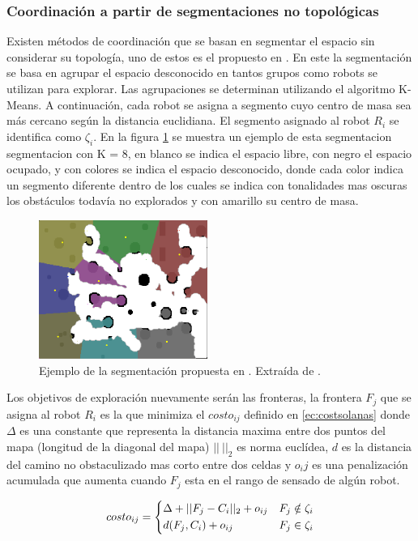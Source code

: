 \subsubsection{Coordinación a partir de segmentaciones no topológicas}\label{subsec:coordNoTop}
Existen métodos de coordinación que se basan en segmentar el espacio sin considerar su topología, uno de estos es el propuesto en \cite{Solanas2004}. En este la segmentación se basa en agrupar el espacio desconocido en tantos grupos como robots se utilizan para explorar. Las agrupaciones se determinan utilizando el algoritmo K-Means\cite{hartigan1979ak}. A continuación, cada robot se asigna a segmento cuyo centro de masa sea más cercano según la distancia euclidiana. El segmento asignado al robot $R_i$ se identifica como $\zeta_i$. En la figura \ref{fig:ejemploCoodGrill} se muestra un ejemplo de esta segmentacion segmentacion con K = 8, en blanco se indica el espacio libre, con negro el espacio ocupado, y con colores se indica el espacio desconocido, donde cada color indica un segmento diferente dentro de los cuales se indica con tonalidades mas oscuras los obstáculos todavía no explorados y con amarillo su centro de masa.
\begin{figure}[H]
  \center
  \includegraphics[width=5.5cm]{imagenes/coordGrillCM.png}
  \caption{Ejemplo de la segmentación propuesta en \cite{Solanas2004}. Extraída de \cite{wu2007voronoi}.}\label{fig:ejemploCoodGrill}
\end{figure} 

Los objetivos de exploración nuevamente serán las fronteras, la frontera $F_j$ que se asigna al robot $R_i$ es la que minimiza el $costo_{ij}$ definido en \eqref{ec:costsolanas} donde $\Delta$ es una constante que representa la distancia maxima entre dos puntos del mapa (longitud de la diagonal del mapa) $||\ ||_2$ es norma euclídea, $d$ es la distancia del camino no obstaculizado mas corto entre dos celdas y $o_ij$ es una penalización acumulada que aumenta cuando $F_j$ esta en el rango de sensado de algún robot.

\begin{equation}\label{ec:costsolanas}
costo_{ij} = 
\begin{dcases}
  \Delta + || F_j - C_i ||_2 + o_{ij} & F_j \notin \zeta_i \\
  d(F_j, C_i) + o_{ij}                & F_j \in    \zeta_i
\end{dcases}
\end{equation}


